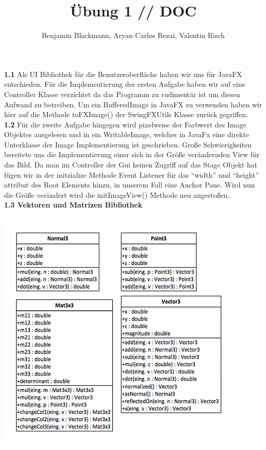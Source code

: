 \documentclass[]{article}
\title{Übung 1 // DOC}
\author{Benjamin Blackmann, Aryan Carlos Rezai, Valentin Risch}
\begin{document}
\maketitle


\textbf{1.1 }Als UI Bibliothek für die Benutzeroberfläche haben wir uns für JavaFX entschieden. Für die Implementierung der ersten Aufgabe haben wir auf eine Controller Klasse verzichtet da das Programm zu rudimentär ist um diesen Aufwand zu betreiben. 
Um ein BufferedImage in JavaFX zu verwenden haben wir hier auf die Methode toFXImage() der SwingFXUtils Klasse zurück gegriffen.\\

\textbf{1.2 }Für die zweite Aufgabe hingegen wird pixelweise der Farbwert des Image Objektes ausgelesen und in ein WritableImage, welches in JavaFx eine direkte Unterklasse der Image Implementierung ist geschrieben.
Große Schwierigkeiten bereitete uns die Implementierung einer sich in der Größe verändernden View für das Bild. Da man im Controller der Gui keinen Zugriff auf das Stage Objekt hat fügen wir in der initzialize Methode Event Listener für das “width” und “height” attribut des Root Elements hinzu, in unserem Fall eine Anchor Pane. Wird nun die Größe verändert wird die initImageView() Methode neu angestoßen.\\

\textbf{1.3    Vektoren und Matrizen Bibliothek}\\

\begin{center}
	\includegraphics[scale=1]{01.png}\\
\end{center}
\end{document}
